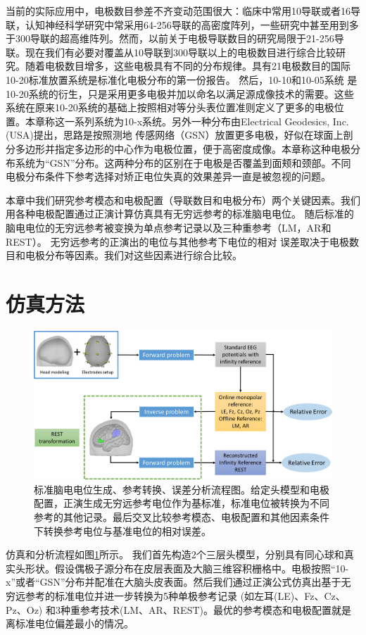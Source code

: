 当前的实际应用中，电极数目参差不齐变动范围很大：临床中常用10导联或者16导联，认知神经科学研究中常采用64-256导联的高密度阵列，一些研究中甚至用到多于300导联的超高维阵列。然而，以前关于电极导联数目的研究局限于21-256导联。现在我们有必要对覆盖从10导联到300导联以上的电极数目进行综合比较研究。随着电极数目增多，这些电极具有不同的分布规律。具有21电极数目的国际10-20标准放置系统是标准化电极分布的第一份报告。 然后，10-10和10-05系统
是10-20系统的衍生，只是采用更多电极并加以命名以满足源成像技术的需要。这些系统在原来10-20系统的基础上按照相对等分头表位置准则定义了更多的电极位置。本章称这一系列系统为10-x系统。另外一种分布由Electrical Geodesics, Inc.(USA)提出，思路是按照测地
传感网络（GSN）放置更多电极，好似在球面上剖分多边形并指定多边形的中心作为电极位置，便于高密度成像。本章称这种电极分布系统为“GSN”分布。这两种分布的区别在于电极是否覆盖到面颊和颈部。不同电极分布条件下参考选择对矫正电位失真的效果差异一直是被忽视的问题。

本章中我们研究参考模态和电极配置（导联数目和电极分布）两个关键因素。我们用各种电极配置通过正演计算仿真具有无穷远参考的标准脑电电位。 随后标准的脑电电位的无穷远参考被变换为单点参考记录以及三种重参考（LM，AR和REST）。 无穷远参考的正演出的电位与其他参考下电位的相对
误差取决于电极数目和电极分布等因素。我们对这些因素进行综合比较。

\section{仿真方法}
\begin{figure}[!h]
	\includegraphics[width=15cm]{pic/JNE/figure1.png}
	\caption{标准脑电电位生成、参考转换、误差分析流程图。给定头模型和电极配置，正演生成无穷远参考电位作为基标准，标准电位被转换为不同
	参考的其他记录。最后交叉比较参考模态、电极配置和其他因素条件下转换参考电位与基准电位的相对误差。}
	\label{pipe}
\end{figure}
仿真和分析流程如图\ref{pipe}所示。 我们首先构造2个三层头模型，分别具有同心球和真实头形状。假设偶极子源分布在皮层表面及大脑三维容积栅格中。电极按照“10-x”或者“GSN”分布并配准在大脑头皮表面。然后我们通过正演公式仿真出基于无穷远参考的标准电位并进一步转换为5种单极参考记录 (如左耳(LE)、Fz、Cz、Pz、Oz) 和3种重参考技术(LM、AR、REST)。最优的参考模态和电极配置就是离标准电位偏差最小的情况。

